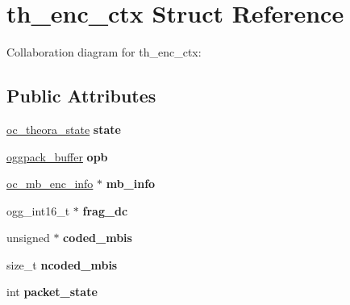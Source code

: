 \hypertarget{structth__enc__ctx}{\section{th\+\_\+enc\+\_\+ctx Struct Reference}
\label{structth__enc__ctx}
}


Collaboration diagram for th\+\_\+enc\+\_\+ctx\+:
\subsection*{Public Attributes}
\begin{DoxyCompactItemize}
\item 
\hypertarget{structth__enc__ctx_a5d4b4f49a654f6faded0e7394b65c19a}{\hyperlink{structoc__theora__state}{oc\+\_\+theora\+\_\+state} {\bfseries state}}\label{structth__enc__ctx_a5d4b4f49a654f6faded0e7394b65c19a}

\item 
\hypertarget{structth__enc__ctx_a5be10baeed5c7a26e87a728fd461f03a}{\hyperlink{structoggpack__buffer}{oggpack\+\_\+buffer} {\bfseries opb}}\label{structth__enc__ctx_a5be10baeed5c7a26e87a728fd461f03a}

\item 
\hypertarget{structth__enc__ctx_abeef58aadd6112152ab1a20b7cd9d135}{\hyperlink{structoc__mb__enc__info}{oc\+\_\+mb\+\_\+enc\+\_\+info} $\ast$ {\bfseries mb\+\_\+info}}\label{structth__enc__ctx_abeef58aadd6112152ab1a20b7cd9d135}

\item 
\hypertarget{structth__enc__ctx_a6f29f07c46da12774dcca9dbeb271e5d}{ogg\+\_\+int16\+\_\+t $\ast$ {\bfseries frag\+\_\+dc}}\label{structth__enc__ctx_a6f29f07c46da12774dcca9dbeb271e5d}

\item 
\hypertarget{structth__enc__ctx_a1bd44123d22074b5d9d42ebd6843012a}{unsigned $\ast$ {\bfseries coded\+\_\+mbis}}\label{structth__enc__ctx_a1bd44123d22074b5d9d42ebd6843012a}

\item 
\hypertarget{structth__enc__ctx_a05383d766d2a66a59fdb0b62b3ab5ec9}{size\+\_\+t {\bfseries ncoded\+\_\+mbis}}\label{structth__enc__ctx_a05383d766d2a66a59fdb0b62b3ab5ec9}

\item 
\hypertarget{structth__enc__ctx_adf227827bbc53f563770185309e885d1}{int {\bfseries packet\+\_\+state}}\label{structth__enc__ctx_adf227827bbc53f563770185309e885d1}


\end{DoxyCompactItemize}
